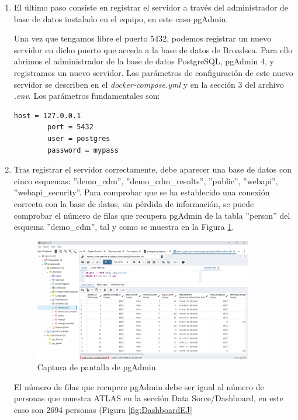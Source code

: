 \documentclass{article}
\begin{document}
\begin{enumerate}
    \item El último paso consiste en registrar el servidor a través del administrador de base de datos instalado en el equipo, en este caso pgAdmin. 
    
    Una vez que tengamos libre el puerto 5432, podemos registrar un nuevo servidor en dicho puerto que acceda a la base de datos de Broadsea. Para ello abrimos el administrador de la base de datos PostgreSQL, pgAdmin 4, y registramos un nuevo servidor. Los parámetros de configuración de este nuevo servidor se describen en el \textit{docker-compose.yml} y en la sección 3 del archivo \textit{.env}. Los parámetros fundamentales son:

    \begin{lstlisting}[language=sh]
        host = 127.0.0.1
        port = 5432
        user = postgres
        password = mypass
    \end{lstlisting}
    
    \item Tras registrar el servidor correctamente, debe aparecer una base de datos con cinco esquemas: ''demo\_cdm'', ''demo\_cdm\_results'', ''public'', ''webapi'', ''webapi\_security''. Para comprobar que se ha establecido una conexión correcta con la base de datos, sin pérdida de información, se puede comprobar el número de filas que recupera pgAdmin de la tabla ''person'' del esquema ''demo\_cdm'', tal y como se muestra en la Figura \ref{fig:pgAdmin}.

    \begin{figure}[H]
    \centering
    \includegraphics[width=0.90\textwidth]{images/pgAdmin.png}
     \caption{Captura de pantalla de pgAdmin.}
    \label{fig:pgAdmin}
    \end{figure}

    El número de filas que recupere pgAdmin debe ser igual al número de personas que muestra ATLAS en la sección Data Sorce/Dashboard, en este caso son 2694 personas (Figura \ref{fig:DashboardEJ}


\end{enumerate}
\end{document}
